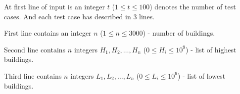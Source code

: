 At first line of input is an integer $t$ ($1 \le t \le 100$) denotes the number of test cases. And each test case has described in $3$ lines.

First line contains an integer $n$ ($1 \le n \le 3000$) - number of buildings.

Second line contains $n$ integers $H_1, H_2, \dots, H_n$ ($0 \le H_i \le 10^9$) - list of highest buildings.

Third line contains $n$ integers $L_1, L_2, \dots, L_n$ ($0 \le L_i \le 10^9$) - list of lowest buildings.